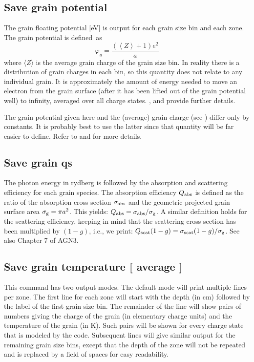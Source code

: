 \subsection{Save grain potential}

 The grain floating potential [eV] is output for each grain size bin and
each zone. The grain potential is defined~as
\begin{equation}
\varphi _g  = \frac{{\left( {\left\langle Z \right\rangle  + 1} \right)e^2
}}{a}
\end{equation}
where $\langle Z\rangle$ is the average grain charge of the grain size bin.  In reality
there is a distribution of grain charges in each bin, so this quantity does
not relate to any individual grain. It is approximately the amount of energy
needed to move an electron from the grain surface (after it has been lifted
out of the grain potential well) to infinity, averaged over all charge
states.
\citet{Weingartner2001a}, \citet{VanHoof2004} and \citet{Weingartner2006} provide further details.

The grain potential given here and the (average) grain charge
(see ) differ only by constants.  It
is probably best to use the latter since that quantity will be far easier
to define. Refer to \citet{Weingartner2001a} and
\citet{VanHoof2004}
for more details.

\subsection{Save grain qs}

The photon energy in rydberg is followed by the absorption and scattering
efficiency for each grain species. The absorption efficiency $Q_{\rm abs}$ is
defined as the ratio of the absorption cross section $\sigma_{\rm abs}$ and
the geometric projected grain surface area $\sigma_{\rm g} = \pi a^2$. This
yields: $Q_{\rm abs} = \sigma_{\rm abs}/\sigma_{\rm g}$. A similar definition
holds for the scattering efficiency, keeping in mind that the scattering cross
section has been multiplied by $(1-g)$, i.e., we print: $Q_{\rm scat} (1-g) =
\sigma_{\rm scat} (1-g) / \sigma_{\rm g}$. See also Chapter 7 of AGN3.

\subsection{Save grain temperature [ average ]}

This command has two output modes. The default mode will print multiple lines
per zone. The first line for each zone will start with the depth (in cm)
followed by the label of the first grain size bin. The remainder of the line
will show pairs of numbers giving the charge of the grain (in elementary
charge units) and the temperature of the grain (in K). Such pairs will be
shown for every charge state that is modeled by the code. Subsequent lines
will give similar output for the remaining grain size bins, except that the
depth of the zone will not be repeated and is replaced by a field of spaces
for easy readability.

